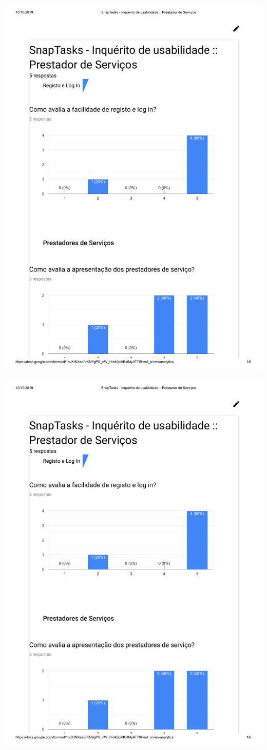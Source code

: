 \includegraphics[page=5,origin=c, width=\textwidth ]{appendices/files/InquiryServiceProvidersAnswers.pdf}

\pagebreak

\includegraphics[page=6,origin=c, width=\textwidth ]{appendices/files/InquiryServiceProvidersAnswers.pdf}